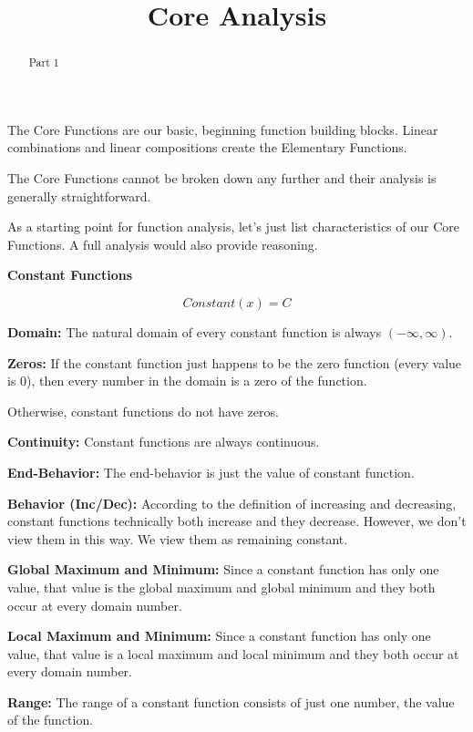 \documentclass{ximera}
\title{Core Analysis}
\begin{document}
\begin{abstract}
Part 1
\end{abstract}
\maketitle


The Core Functions are our basic, beginning function building blocks. Linear combinations and linear compositions create the Elementary Functions.

The Core Functions cannot be broken down any further and their analysis is generally straightforward.

As a starting point for function analysis, let's just list characteristics of our Core Functions. A full analysis would also provide reasoning.


\begin{explanation} \textbf{\textcolor{red!75!green}{Constant Functions}} 


\[ Constant(x) = C  \]



\textbf{Domain:} The natural domain of every constant function is always $(-\infty, \infty)$.

\textbf{Zeros:} If the constant function just happens to be the zero function (every value is $0$), then every number in the domain is a zero of the function.

Otherwise, constant functions do not have zeros.

\textbf{Continuity:} Constant functions are always continuous.

\textbf{End-Behavior:} The end-behavior is just the value of constant function.


\textbf{Behavior (Inc/Dec):} According to the definition of increasing and decreasing, constant functions technically both increase and they decrease. However, we don't view them in this way. We view them as remaining constant.

\textbf{Global Maximum and Minimum:} Since a constant function has only one value, that value is the global maximum and global minimum and they both occur at every domain number.

\textbf{Local Maximum and Minimum:}  Since a constant function has only one value, that value is a local maximum and local minimum and they both occur at every domain number.

\textbf{Range:} The range of a constant function consists of just one number, the value of the function.

\end{explanation}
\end{document}
